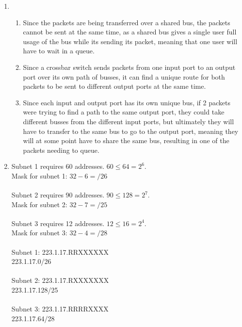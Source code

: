\documentclass[12pt]{article}
\begin{document}
\begin{enumerate}
	\item \begin{enumerate}

			\item Since the packets are being transferred over a shared bus, the packets cannot be sent at the same time, as a shared bus gives a single user full usage of the bus while its sending its packet, meaning that one user will have to wait in a queue.
			\item Since a crossbar switch sends packets from one input port to an output port over its own path of busses, it can find a unique route for both packets to be sent to different output ports at the same time.
			\item Since each input and output port has its own unique bus, if 2 packets were trying to find a path to the same output port, they could take different busses from the different input ports, but ultimately they will have to transfer to the same bus to go to the output port, meaning they will at some point have to share the same bus, resulting in one of the packets needing to queue.

		\end{enumerate}

	\item Subnet 1 requires 60 addresses. $60 \leq 64 = 2^{6}$.\\
	Mask for subnet 1: $32 - 6 = /26$\\
	\\
	Subnet 2 requires 90 addresses. $90 \leq 128 = 2^{7}$.\\
	Mask for subnet 2: $32 - 7 = /25$\\
	\\
	Subnet 3 requires 12 addresses. $12 \leq 16 = 2^{4}$.\\
	Mask for subnet 3: $32 - 4 = /28$\\
	\\
	Subnet 1: 223.1.17.RRXXXXXX\\
	223.1.17.0/26\\
	\\
	Subnet 2: 223.1.17.RXXXXXXX\\
	223.1.17.128/25\\
	\\
	Subnet 3: 223.1.17.RRRRXXXX\\
	223.1.17.64/28\\
	\\


\end{enumerate}
\end{document}
